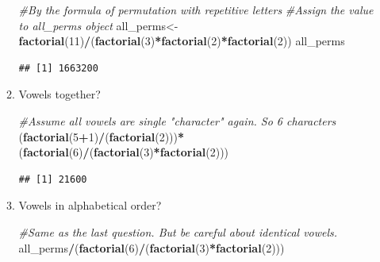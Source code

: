 \documentclass[]{book}
\newenvironment{Shaded}{\begin{snugshade}}{\end{snugshade}}
\newcommand{\CommentTok}[1]{\textcolor[rgb]{0.56,0.35,0.01}{\textit{#1}}}
\newcommand{\DecValTok}[1]{\textcolor[rgb]{0.00,0.00,0.81}{#1}}
\newcommand{\KeywordTok}[1]{\textcolor[rgb]{0.13,0.29,0.53}{\textbf{#1}}}
\newcommand{\NormalTok}[1]{#1}
\newcommand{\OperatorTok}[1]{\textcolor[rgb]{0.81,0.36,0.00}{\textbf{#1}}}
\theoremstyle{definition}
\theoremstyle{definition}
\theoremstyle{definition}
\theoremstyle{remark}
\begin{document}
\begin{itemize}
\begin{enumerate}
\begin{Shaded}
\begin{Highlighting}[]
\CommentTok{#By the formula of permutation with repetitive letters}
\CommentTok{#Assign the value to all_perms object}
\NormalTok{all_perms<-}\KeywordTok{factorial}\NormalTok{(}\DecValTok{11}\NormalTok{)}\OperatorTok{/}\NormalTok{(}\KeywordTok{factorial}\NormalTok{(}\DecValTok{3}\NormalTok{)}\OperatorTok{*}\KeywordTok{factorial}\NormalTok{(}\DecValTok{2}\NormalTok{)}\OperatorTok{*}\KeywordTok{factorial}\NormalTok{(}\DecValTok{2}\NormalTok{))}
\NormalTok{all_perms}
\end{Highlighting}
\end{Shaded}

\begin{verbatim}
## [1] 1663200
\end{verbatim}
  \item
    Vowels together?

\begin{Shaded}
\begin{Highlighting}[]
\CommentTok{#Assume all vowels are single "character" again. So 6 characters}
\NormalTok{(}\KeywordTok{factorial}\NormalTok{(}\DecValTok{5}\OperatorTok{+}\DecValTok{1}\NormalTok{)}\OperatorTok{/}\NormalTok{(}\KeywordTok{factorial}\NormalTok{(}\DecValTok{2}\NormalTok{)))}\OperatorTok{*}\NormalTok{(}\KeywordTok{factorial}\NormalTok{(}\DecValTok{6}\NormalTok{)}\OperatorTok{/}\NormalTok{(}\KeywordTok{factorial}\NormalTok{(}\DecValTok{3}\NormalTok{)}\OperatorTok{*}\KeywordTok{factorial}\NormalTok{(}\DecValTok{2}\NormalTok{)))}
\end{Highlighting}
\end{Shaded}

\begin{verbatim}
## [1] 21600
\end{verbatim}
  \item
    Vowels in alphabetical order?

\begin{Shaded}
\begin{Highlighting}[]
\CommentTok{#Same as the last question. But be careful about identical vowels.}
\NormalTok{all_perms}\OperatorTok{/}\NormalTok{(}\KeywordTok{factorial}\NormalTok{(}\DecValTok{6}\NormalTok{)}\OperatorTok{/}\NormalTok{(}\KeywordTok{factorial}\NormalTok{(}\DecValTok{3}\NormalTok{)}\OperatorTok{*}\KeywordTok{factorial}\NormalTok{(}\DecValTok{2}\NormalTok{)))}
\end{Highlighting}
\end{Shaded}


\end{enumerate}
\end{itemize}
\end{document}
